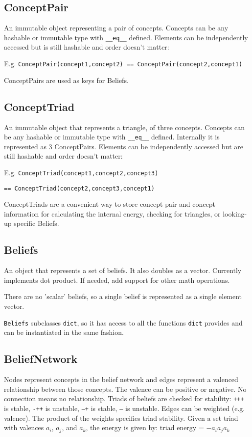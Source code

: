 \documentclass[11pt, a4paper]{article}
\begin{document}
\subsection{ConceptPair}
An immutable object representing a pair of concepts. Concepts can be any hashable or immutable type with \texttt{\_\_eq\_\_} defined. Elements can be independently accessed but is still hashable and order doesn't matter: 

E.g. \texttt{ConceptPair(concept1,concept2) == ConceptPair(concept2,concept1)}

ConceptPairs are used as keys for Beliefs.

\subsection{ConceptTriad}
An immutable object that represents a triangle, of three concepts. Concepts can be any hashable or immutable type with \texttt{\_\_eq\_\_} defined. Internally it is represented as 3 ConceptPairs. Elements can be independently accessed but are still hashable and order doesn't matter: 

E.g. \texttt{ConceptTriad(concept1,concept2,concept3)} 

\texttt{== ConceptTriad(concept2,concept3,concept1)}

ConceptTriads are a convenient way to store concept-pair and concept information for calculating the internal energy, checking for triangles, or looking-up specific Beliefs.

\subsection{Beliefs}

An object that represents a set of beliefs. It also doubles as a vector. Currently implements dot product. If needed, add support for other math operations.

There are no 'scalar' beliefs, so a single belief is represented as a single element vector.

\texttt{Beliefs} subclasses \texttt{dict}, so it has access to all the functions \texttt{dict} provides and can be instantiated in the same fashion.

\subsection{BeliefNetwork}
Nodes represent concepts in the belief network and edges represent a valenced relationship between those concepts. The valence can be positive or negative. No connection means no relationship. Triads of beliefs are checked for stability:
\texttt{+++} is stable,
\texttt{-++} is unstable,
\texttt{--+} is stable,
\texttt{---} is unstable.
Edges can be weighted (e.g. valence). The product of the weights specifies triad stability. Given a set triad with valences $a_i$, $a_j$, and $a_k$, the energy is given by: triad energy = $- a_i  a_j  a_k$
\end{document}
